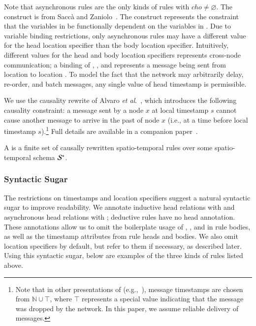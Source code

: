 Note that asynchronous rules are the only kinds of rules with $cho \neq \varnothing$.
The  construct is from Sacc\`{a} and Zaniolo~\cite{sacca-zaniolo}.
The  construct represents the constraint that the variables in  be functionally dependent on the variables in .
Due to variable binding restrictions, only asynchronous rules may
have a different value for the head location specifier than the body location
specifier.  Intuitively, different values for the head and body location specifiers represents
cross-node communication; a binding of , , and 
represents a message
being sent from location  to location .  To model the fact
that the network may arbitrarily delay, re-order, and batch messages, any single
value of head timestamp  is permissible.

We use the causality rewrite of Alvaro \emph{et al}.~\cite{ameloot-operational}, which introduces the following causality constraint: a message sent by a node $x$ at local timestamp $s$ cannot cause another message to arrive in the past of node $x$ (i.e., at a time before local timestamp $s$).\footnote{Note that in
  other presentations of \lang (e.g.,~\cite{dedalus}), message timestamps are
  chosen from $\mathbb{N} \cup \top$, where $\top$ represents a special value
  indicating that the message was dropped by the network. In this paper, we
  assume reliable delivery of messages.}  Full details are available in a companion paper~\cite{ameloot-operational}.

A  is a finite set of causally rewritten spatio-temporal rules over some spatio-temporal schema $\stschema$.  

\subsubsection{Syntactic Sugar}
The restrictions on timestamps and location specifiers suggest a natural
syntactic sugar to improve readability.  We annotate inductive head relations
with  and asynchronous head relations with ;
deductive rules have no head annotation.  These annotations allow us to omit the
boilerplate usage of , ,  and
 in rule bodies, as well as the timestamp attributes from rule
heads and bodies.  We also omit location specifiers by default, but refer to them if necessary, as described later.  Using this syntactic sugar, below are examples of the three kinds of rules listed above.


